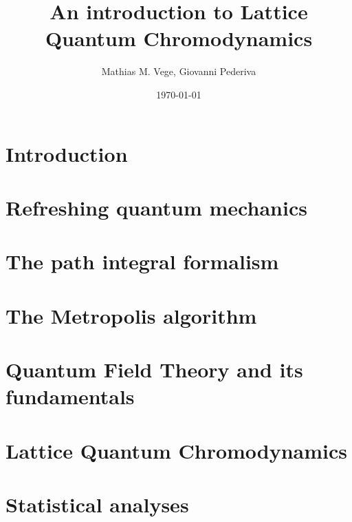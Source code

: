 \documentclass[11pt]{article}
\title{An introduction to Lattice Quantum Chromodynamics}
\author{Mathias M. Vege, Giovanni Pederiva}
\date{\today}
\begin{document}
\maketitle

\begin{abstract}

\end{abstract}


\section{Introduction}


\section{Refreshing quantum mechanics}


\section{The path integral formalism}


\section{The Metropolis algorithm}


\section{Quantum Field Theory and its fundamentals}


\section{Lattice Quantum Chromodynamics}


\section{Statistical analyses}




\end{document}
